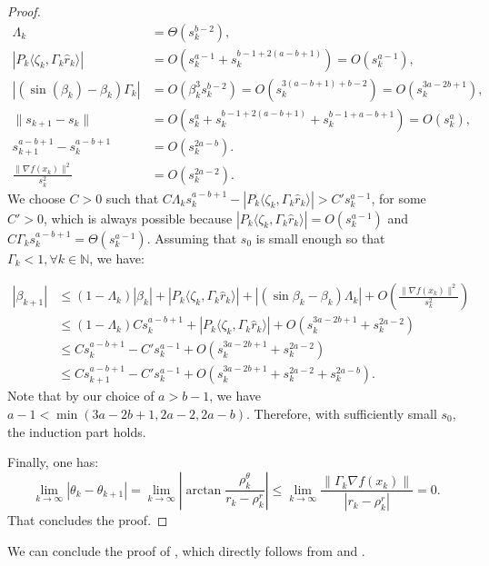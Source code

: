 \documentclass{article}
\theoremstyle{plain}
\theoremstyle{definition}
\theoremstyle{remark}
\newcommand{\innp}[2]{\langle #1, #2 \rangle}
\newcommand*{\NN}{\mathbb{N}}
\begin{document}
\begin{proof}
    \begin{equation*}
        \begin{aligned}
            \Lambda_k &= \Theta(s_k^{b - 2}),\\
            |P_k\innp{\zeta_k}{\Gamma_k\hat{r}_k}| &= O(s_k^{a - 1} + s_k^{b-1 + 2(a-b+1)}) = O(s_k^{a - 1}),\\
            |(\sin(\beta_k) - \beta_k)\Gamma_k| &= O(\beta_k^3s_k^{b - 2}) = O(s_k^{3(a - b + 1) + b - 2}) = O(s_k^{3a -2b + 1}),\\
            \|s_{k+1}-s_k\| &= O(s_k^{a} + s_k^{b - 1 + 2(a - b + 1)} + s_k^{b - 1 + a - b + 1}) = O(s_k^{a}),\\
            s_{k + 1}^{a - b + 1} - s_k^{a - b + 1} &= O(s_k^{2a - b}).\\
            \frac{\|\nabla f(x_k)\|^2}{s_k^2} &= O(s_k^{2a - 2}).
        \end{aligned}
    \end{equation*}
    We choose $C > 0$ such that $C\Lambda_ks_k^{a - b + 1} - |P_k \innp{\zeta_k}{\Gamma_k\hat{r}_k}| > C's_k^{a - 1}$, for some $C' > 0$, which is always possible because $|P_k\innp{\zeta_k}{\Gamma_k\hat{r}_k}| = O(s_{k}^{a - 1})$ and $C\Gamma_ks_k^{a - b + 1} = \Theta(s_{k}^{a - 1})$. Assuming that $s_0$ is small enough so that $\Gamma_k < 1, \forall k \in \NN$, we have:

    \begin{equation*}
        \begin{aligned}
            |\beta_{k+1}| &\leq (1 - \Lambda_k)|\beta_k| + |P_k\innp{\zeta_k}{\Gamma_k\hat{r}_k}| + |(\sin \beta_k - \beta_k)\Lambda_k| + O\left(\frac{\|\nabla f(x_k)\|^2}{s_k^2}\right)\\
            &\leq (1 - \Lambda_k) Cs_k^{a - b + 1} + |P_k\innp{\zeta_k}{\Gamma_k\hat{r}_k}| + O(s_k^{3a - 2b + 1} + s_k^{2a - 2})\\
            &\leq Cs_k^{a - b + 1} - C's_k^{a - 1} + O(s_k^{3a - 2b + 1} + s_k^{2a - 2})\\
            &\leq Cs_{k+1}^{a - b + 1} - C's_k^{a - 1} + O(s_k^{3a - 2b + 1} + s_k^{2a - 2} + s_k^{2a - b}).
        \end{aligned}
    \end{equation*}
    Note that by our choice of $a > b - 1$, we have $a - 1 < \min(3a - 2b + 1, 2a - 2, 2a - b)$. Therefore, with sufficiently small $s_0$, the induction part holds.

    Finally, one has:
    \begin{equation*}
        \lim_{k \to \infty} |\theta_k - \theta_{k + 1}| = \lim_{k \to \infty}\left|\arctan \frac{\rho_k^\theta}{r_k - \rho^r_k}\right| \leq \lim_{k \to \infty} \frac{\|\Gamma_k\nabla f(x_k)\|}{|r_k - \rho^r_k|} = 0.
    \end{equation*}
    That concludes the proof.
\end{proof}

We can conclude the proof of , which directly follows from  and .
\end{document}
